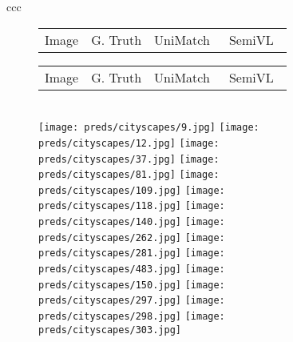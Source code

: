\documentclass[10pt,twocolumn,letterpaper]{article}
\newcommand{\ours}{SemiVL}
\begin{document}
\begin{figure*}
\begin{tabular}{ccc}
\begin{figure*}
\footnotesize
\centering
\begin{tabularx}{.48\linewidth}{*{4}{Y}}
Image & G. Truth & UniMatch~\cite{yang2023revisiting} & \ours\ \\
\end{tabularx} 
\begin{tabularx}{.48\linewidth}{*{4}{Y}}
Image & G. Truth & UniMatch~\cite{yang2023revisiting} & \ours\ \\
\end{tabularx} \\
\texttt{[image: preds/cityscapes/9.jpg]}
\texttt{[image: preds/cityscapes/12.jpg]}
\texttt{[image: preds/cityscapes/37.jpg]}
\texttt{[image: preds/cityscapes/81.jpg]}
\texttt{[image: preds/cityscapes/109.jpg]}
\texttt{[image: preds/cityscapes/118.jpg]}
\texttt{[image: preds/cityscapes/140.jpg]}
\texttt{[image: preds/cityscapes/262.jpg]}
\texttt{[image: preds/cityscapes/281.jpg]}
\texttt{[image: preds/cityscapes/483.jpg]}
\texttt{[image: preds/cityscapes/150.jpg]}
\texttt{[image: preds/cityscapes/297.jpg]}
\texttt{[image: preds/cityscapes/298.jpg]}
\texttt{[image: preds/cityscapes/303.jpg]}
\scriptsize \setlength{}
\end{figure*}
\end{tabular}
\end{figure*}
\end{document}
